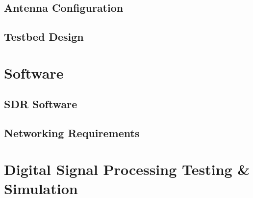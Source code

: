 \subsection{Antenna Configuration \label{sec:antenna}}
\subsection{Testbed Design \label{sec:testbed}}


\section{Software}
\subsection{SDR Software \label{sec:SDRsoftware}}
\subsection{Networking Requirements \label{sec:networking}}


\section{Digital Signal Processing Testing \& Simulation}



